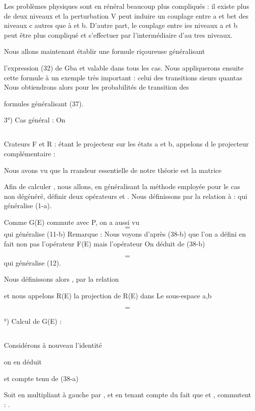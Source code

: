 Les problèmes physiques sont en rénéral beaucoup plus compliqués : il
existe plus de deux niveaux et la perturbation V peut induire un couplage entre
a et bet des niveaux c autres que à et b. D'autre part, le couplage entre ies
niveaux a et b peut être plus compliqué et s'effectuer par l'intermédiaire d'au
tres niveaux.

Nous allons maintenant établir une formule riçoureuse généralisant

l'expression (32) de Gba et valable dans tous les cas. Nous appliquerons ensuite
cette formule à un exemple très important : celui des transitions 
sieurs quantas Nous obtiendrons alors pour les probabilités de transition des

formules généralisant (37).

3°) Cas général : On
\subsection{}%
Crateurs F et R :
 étant le projecteur sur les états a et b, appelons d le projecteur complémentaire :

Nous avons vu que la rrandeur essentielle de notre théorie est la matrice

Afin de calculer , nous allons, en généralisant la méthode employée
pour le cas non dégénéré, définir deux opérateurs  et .
Nous définissons  par la relation
à : 
qui généralise (1-a).

Comme G(E) commute avec P, on a aussi
vu
\[
\tag{38-b}=
\]
qui généralise (11-b)
Remarque : Nous voyons d'après (38-b) que l'on a défini en fait non pas l'opérateur
F(E) mais l'opérateur
On déduit de (38-b)

\[
\tag{39}=
\]
qui généralise (12).

Nous définissons alors , par la relation

et nous appelons R(E) la projection de R(E) dans Le sous-espace a,b


\[
\tag{43}=
\]

°) Calcul de G(E) :
\subsection{}%
Considérons à nouveau l'identité

on en déduit

et compte tenu de (38-a)

Soit en multipliant à gauche par , et en tenant compte du fait que
 et , commutent : .

